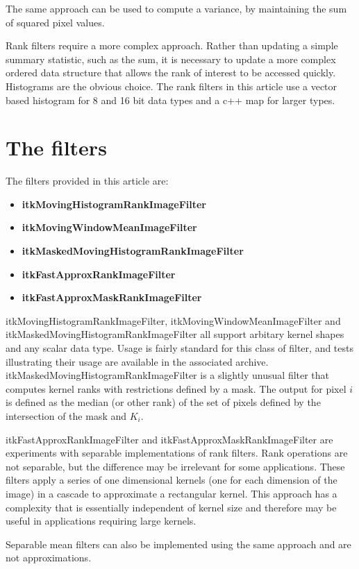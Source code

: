 \documentclass{InsightArticle}
\begin{document}
The same approach can be used to compute a variance, by maintaining
the sum of squared pixel values.

Rank filters require a more complex approach. Rather than updating a
simple summary statistic, such as the sum, it is necessary to update a
more complex ordered data structure that allows the rank of interest
to be accessed quickly. Histograms are the obvious choice. The rank
filters in this article use a vector based histogram for 8 and 16 bit
data types and a c++ map for larger types. 

\section{The filters}
The filters provided in this article are:
\begin{itemize}
\item {\bf itkMovingHistogramRankImageFilter}
\item {\bf itkMovingWindowMeanImageFilter}
\item {\bf itkMaskedMovingHistogramRankImageFilter}
\item {\bf itkFastApproxRankImageFilter}
\item {\bf itkFastApproxMaskRankImageFilter}
\end{itemize}

itkMovingHistogramRankImageFilter, itkMovingWindowMeanImageFilter and
itkMaskedMovingHistogramRankImageFilter all support arbitary kernel
shapes and any scalar data type. Usage is fairly standard for this
class of filter, and tests illustrating their usage are available in
the associated archive. itkMaskedMovingHistogramRankImageFilter is a
slightly unusual filter that computes kernel ranks with restrictions
defined by a mask. The output for pixel $i$ is defined as the median
(or other rank) of the set of pixels defined by the intersection of
the mask and $K_i$.

itkFastApproxRankImageFilter and itkFastApproxMaskRankImageFilter are
experiments with separable implementations of rank filters. Rank
operations are not separable, but the difference may be irrelevant for
some applications. These filters apply a series of one dimensional
kernels (one for each dimension of the image) in a cascade to
approximate a rectangular kernel. This approach has a complexity that
is essentially independent of kernel size and therefore may be useful
in applications requiring large kernels.

Separable mean filters can also be implemented using the same approach
and are not approximations.
\end{document}
